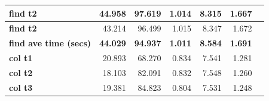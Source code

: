\documentclass[12pt]{article}
\begin{document}
\begin{center}
\begin{tabular}{|l|r|r|r|r|r|l|}
    \textbf{find t2}                 & 44.958                            & 97.619                            & 1.014                                                                                    & 8.315                                                                                       & 1.667                                                                                         &                                    \\ \hline
    \textbf{find t2}                 & 43.214                            & 96.499                            & 1.015                                                                                    & 8.347                                                                                       & 1.672                                                                                         &                                    \\ \hline
    \textbf{find ave time (secs)}    & \textbf{44.029}                   & \textbf{94.937}                   & \textbf{1.011}                                                                           & \textbf{8.584}                                                                              & \textbf{1.691}                                                                                & \textbf{}                          \\ \hline
    \textbf{col t1}                  & 20.893                            & 68.270                            & 0.834                                                                                    & 7.541                                                                                       & 1.281                                                                                         &                                    \\ \hline
    \textbf{col t2}                  & 18.103                            & 82.091                            & 0.832                                                                                    & 7.548                                                                                       & 1.260                                                                                         &                                    \\ \hline
    \textbf{col t3}                  & 19.381                            & 84.823                            & 0.804                                                                                    & 7.531                                                                                       & 1.248                                                                                         &                                    \\ \hline

\end{tabular}
\end{center}
\end{document}
